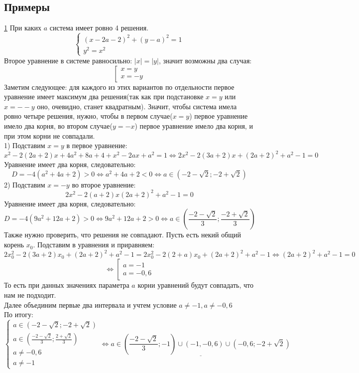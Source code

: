 \documentclass{article}
\begin{document}
\subsection{Примеры}
\underline{1} При каких $a$ система имеет ровно 4 решения.
\[
\begin{cases}
(x - 2a - 2)^2 + (y - a)^2 = 1
\\
y^2 = x^2
\end{cases}
\]
Второе уравнение в системе равносильно: $|x| = |y|$, значит возможны два случая:
\[ 
\left[
\begin{gathered}
x = y
\\
x = -y
\end{gathered}
\right.
\]
Заметим следующее: для каждого из этих вариантов по отдельности первое
уравнение имеет максимум два решения(так как при подстановке $x = y$ или $x =- -y$ оно, очевидно, станет квадратным). Значит, чтобы система имела ровно четыре решения, нужно, чтобы в первом случае($x = y$) первое уравнение имело два корня, во втором случае($y = -x$) первое уравнение имело два корня, и при этом корни не совпадали. 
\\
1) Подставим $x = y$ в первое уравнение:
\[ x^2 - 2(2a + 2) x + 4a^2 + 8a + 4 + x^2 - 2ax + a^2 = 1 \Leftrightarrow 
2x^2 - 2(3a + 2)x + (2a + 2)^2 + a^2 - 1 = 0 \]
Уравнение имеет два корня, следовательно:
\[ D = -4(a^2 + 4a + 2) > 0 \Leftrightarrow a^2 + 4a + 2 < 0 \Leftrightarrow 
a \in (-2 - \sqrt{2}; -2 + \sqrt{2}) \]
2) Подставим $x = -y$ во второе уравнение:
\[ 2x^2 - 2(a + 2)x (2a + 2)^2 + a^2 - 1 = 0 \]
Уравнение имеет два корня, следовательно:
\[ D = -4(9a^2 + 12a + 2) > 0 \Leftrightarrow  9a^2 + 12a + 2 > 0 
\Leftrightarrow a \in (\frac{-2 -\sqrt{2}}{3}; \frac{-2 + \sqrt{2}}{3}) \]
Также нужно проверить, что решения не совпадают. Пусть есть некий общий корень $x_0$. Подставим в уравнения и приравняем:
\[ 2x_0^2 - 2(3a + 2)x_0 + (2a + 2)^2 + a^2 - 1 = 2x_0^2 - 2(2 + a)x_0 + (2a + 2)^2 + a^2 - 1  
\Leftrightarrow (2a + 2)^2 + a^2 - 1 = 0 \]
\[ \Leftrightarrow 
\left[
\begin{gathered}
a = -1 
\\
a = -0,6
\end{gathered}
\right.
\]
То есть при данных значениях параметра $a$ корни уравнений будут совпадать, что нам не подходит.
\\
Далее объединим первые два интервала и учтем условие $a \neq -1, a \neq -0,6$
\\
По итогу:
\[
\begin{cases}
a \in (-2 -\sqrt{2}; -2 + \sqrt{2})
\\
a \in (\frac{-2 - \sqrt{2}}{3};\frac{2 + \sqrt{2}}{3})
\\
a \neq -0,6
\\
a \neq -1
\end{cases}
\Leftrightarrow
\underline{a \in (\frac{-2 - \sqrt{2}}{3}; -1) \cup (-1, -0,6) \cup (-0,6; -2 + \sqrt{2})}
\]
\end{document}
